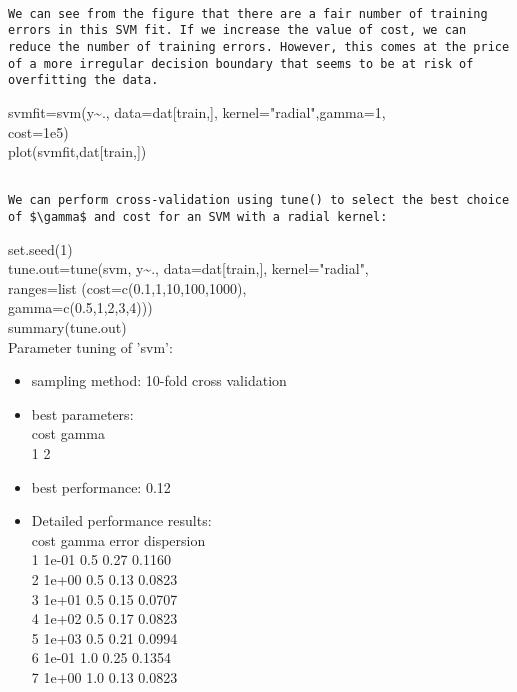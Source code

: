 \documentclass[10pt]{article}
\begin{document}
\begin{verbatim}

We can see from the figure that there are a fair number of training errors in this SVM fit. If we increase the value of cost, we can reduce the number of training errors. However, this comes at the price of a more irregular decision boundary that seems to be at risk of overfitting the data.
\end{verbatim}

\begin{displayquote}
svmfit=svm(y\~{}., data=dat[train,], kernel="radial",gamma=1,\\
cost=1e5)\\[0pt]
plot(svmfit,dat[train,])
\end{displayquote}

\begin{verbatim}

We can perform cross-validation using tune() to select the best choice of $\gamma$ and cost for an SVM with a radial kernel:
\end{verbatim}

\begin{displayquote}
set.seed(1)\\[0pt]
tune.out=tune(svm, y\~{}., data=dat[train,], kernel="radial",\\
ranges=list (cost=c(0.1,1,10,100,1000),\\
gamma=c(0.5,1,2,3,4)))\\
summary(tune.out)\\
Parameter tuning of 'svm':
\end{displayquote}

\begin{itemize}
  \item sampling method: 10-fold cross validation
  \item best parameters:\\
cost gamma\\
1 2
  \item best performance: 0.12
  \item Detailed performance results:\\
cost gamma error dispersion\\
1 1e-01 0.5 0.27 0.1160\\
2 1e+00 0.5 0.13 0.0823\\
3 1e+01 0.5 0.15 0.0707\\
4 1e+02 0.5 0.17 0.0823\\
5 1e+03 0.5 0.21 0.0994\\
6 1e-01 1.0 0.25 0.1354\\
7 1e+00 1.0 0.13 0.0823
\end{itemize}
\end{document}
